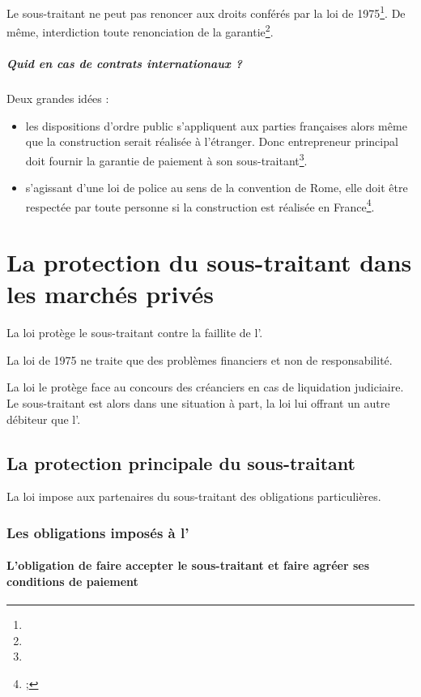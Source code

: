 	Le sous-traitant ne peut pas renoncer aux droits conférés par la loi de 1975\footnote{}.
De même, interdiction toute renonciation de la garantie\footnote{}.
	\subparagraph{Quid en cas de contrats internationaux ?}
	Deux grandes idées :

	\begin{itemize}
		\item les dispositions d'ordre public s’appliquent aux parties françaises alors même que la construction serait réalisée à l’étranger. Donc entrepreneur principal doit fournir la garantie de paiement à son sous-traitant\footnote{}.
		\item s'agissant d'une loi de police au sens de la convention de Rome, elle doit  être respectée par toute personne si la construction est réalisée en France\footnote{ ;  }.
	\end{itemize}


\section{La protection du sous-traitant dans les marchés privés}

	La loi protège le sous-traitant contre la faillite de l’\ep.


	La loi de 1975 ne traite que des problèmes financiers et non de responsabilité.


	La loi le protège face au concours des créanciers en cas de liquidation judiciaire. Le sous-traitant est alors dans une situation à part, la loi lui offrant un autre débiteur que l’\ep.



	\subsection{La protection principale du sous-traitant}

		La loi impose aux partenaires du sous-traitant des obligations particulières.

		\subsubsection{Les obligations imposés à l'\ep}

			\paragraph{L'obligation de faire accepter le sous-traitant et faire agréer ses conditions de paiement\\}

